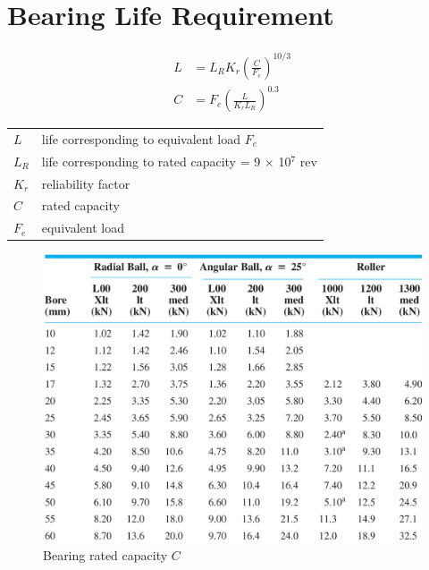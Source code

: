 \documentclass[a4paper,openany]{tufte-book}
\begin{document}
\section{Bearing Life Requirement}
\label{sec:orgb927220}

\begin{align}
    L &= L_R K_r \left( \frac{C}{F_e} \right)^{10/3} \\
    C &= F_e \left( \frac{L}{K_r L_R} \right)^{0.3}
\end{align}

\begin{center}
\begin{tabular}{ll}
\(L\) & life corresponding to equivalent load \(F_e\)\\
\(L_R\) & life corresponding to rated capacity = 9 \(\times\) 10\(^7\) rev\\
\(K_r\) & reliability factor\\
\(C\) & rated capacity\\
\(F_e\) & equivalent load\\
\end{tabular}
\end{center}


\begin{figure}[htbp]
\centering
\includegraphics[width=.9\linewidth]{./pictures/Bearings/bearing-rated-capacity.png}
\caption{Bearing rated capacity \(C\)}
\end{figure}
\end{document}
